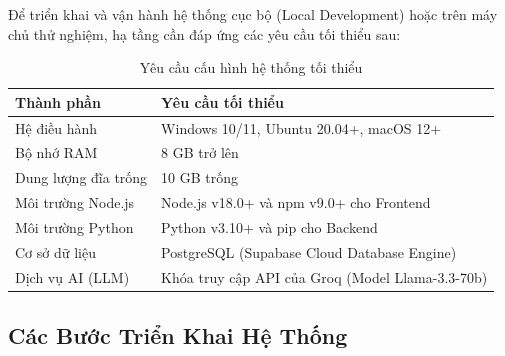 Để triển khai và vận hành hệ thống cục bộ (Local Development) hoặc trên máy chủ thử nghiệm, hạ tầng cần đáp ứng các yêu cầu tối thiểu sau:

\begin{table}[htbp]
  \centering
  \begin{tabularx}{\textwidth}{|l|X|}
    \hline
    \textbf{Thành phần} & \textbf{Yêu cầu tối thiểu} \\
    \hline
    Hệ điều hành       & Windows 10/11, Ubuntu 20.04+, macOS 12+ \\ \hline
    Bộ nhớ RAM          & 8 GB trở lên \\ \hline
    Dung lượng đĩa trống & 10 GB trống \\ \hline
    Môi trường Node.js  & Node.js v18.0+ và npm v9.0+ cho Frontend \\ \hline
    Môi trường Python   & Python v3.10+ và pip cho Backend \\ \hline
    Cơ sở dữ liệu       & PostgreSQL (Supabase Cloud Database Engine) \\ \hline
    Dịch vụ AI (LLM)    & Khóa truy cập API của Groq (Model Llama-3.3-70b) \\
    \hline
  \end{tabularx}
  \caption{Yêu cầu cấu hình hệ thống tối thiểu}
  \label{tab:system-req}
\end{table}

\subsection{Các Bước Triển Khai Hệ Thống}

